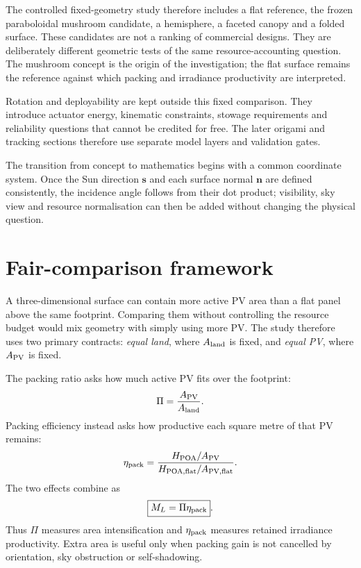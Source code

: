 \documentclass[11pt,a4paper]{article}
\begin{document}
The controlled fixed-geometry study therefore includes a flat reference, the frozen paraboloidal mushroom candidate, a hemisphere, a faceted canopy and a folded surface. These candidates are not a ranking of commercial designs. They are deliberately different geometric tests of the same resource-accounting question. The mushroom concept is the origin of the investigation; the flat surface remains the reference against which packing and irradiance productivity are interpreted.

Rotation and deployability are kept outside this fixed comparison. They introduce actuator energy, kinematic constraints, stowage requirements and reliability questions that cannot be credited for free. The later origami and tracking sections therefore use separate model layers and validation gates.

The transition from concept to mathematics begins with a common coordinate system. Once the Sun direction $\mathbf{s}$ and each surface normal $\mathbf{n}$ are defined consistently, the incidence angle follows from their dot product; visibility, sky view and resource normalisation can then be added without changing the physical question.

\section{Fair-comparison framework}
A three-dimensional surface can contain more active PV area than a flat panel above the same footprint. Comparing them without controlling the resource budget would mix geometry with simply using more PV. The study therefore uses two primary contracts: \emph{equal land}, where $A_{\rm land}$ is fixed, and \emph{equal PV}, where $A_{\rm PV}$ is fixed.

The packing ratio asks how much active PV fits over the footprint:
\begin{equation}\Pi=\frac{A_{\rm PV}}{A_{\rm land}}.\label{eq:packing-ratio}\end{equation}
Packing efficiency instead asks how productive each square metre of that PV remains:
\begin{equation}
\eta_{\rm pack}=\frac{H_{\rm POA}/A_{\rm PV}}{H_{\rm POA,flat}/A_{\rm PV,flat}}.
\label{eq:packing-efficiency}
\end{equation}
The two effects combine as
\begin{equation}\boxed{M_L=\Pi\eta_{\rm pack}}.\label{eq:land-energy-identity}\end{equation}
Thus $\Pi$ measures area intensification and $\eta_{\rm pack}$ measures retained irradiance productivity. Extra area is useful only when packing gain is not cancelled by orientation, sky obstruction or self-shadowing.
\end{document}
